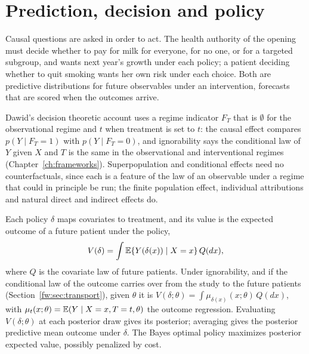 \section{Prediction, decision and policy}\label{sec:policyvalue}

Causal questions are asked in order to act. The health authority of the opening must decide whether to pay for milk for everyone, for no one, or for a targeted subgroup, and wants next year's growth under each policy; a patient deciding whether to quit smoking wants her own risk under each choice. Both are predictive distributions for future observables under an intervention, forecasts that are scored when the outcomes arrive.

Dawid's decision theoretic account uses a regime indicator $F_T$ that is $\emptyset$ for the observational regime and $t$ when treatment is set to $t$: the causal effect compares $p(Y \mid F_T = 1)$ with $p(Y \mid F_T = 0)$, and ignorability says the conditional law of $Y$ given $X$ and $T$ is the same in the observational and interventional regimes (Chapter~\ref{ch:frameworks}). Superpopulation and conditional effects need no counterfactuals, since each is a feature of the law of an observable under a regime that could in principle be run; the finite population effect, individual attributions and natural direct and indirect effects do.

Each policy $\delta$ maps covariates to treatment, and its value is the expected outcome of a future patient under the policy,
\[
V(\delta) = \int \mathbb{E}\{Y(\delta(x)) \mid X = x\}\,Q(dx),
\]
where $Q$ is the covariate law of future patients. Under ignorability, and if the conditional law of the outcome carries over from the study to the future patients (Section~\ref{fw:sec:transport}), given $\theta$ it is $V(\delta;\theta) = \int \mu_{\delta(x)}(x;\theta)\,Q(dx)$, with $\mu_t(x;\theta) = \mathbb{E}(Y \mid X = x, T = t, \theta)$ the outcome regression. Evaluating $V(\delta;\theta)$ at each posterior draw gives its posterior; averaging gives the posterior predictive mean outcome under $\delta$. The Bayes optimal policy maximizes posterior expected value, possibly penalized by cost.

